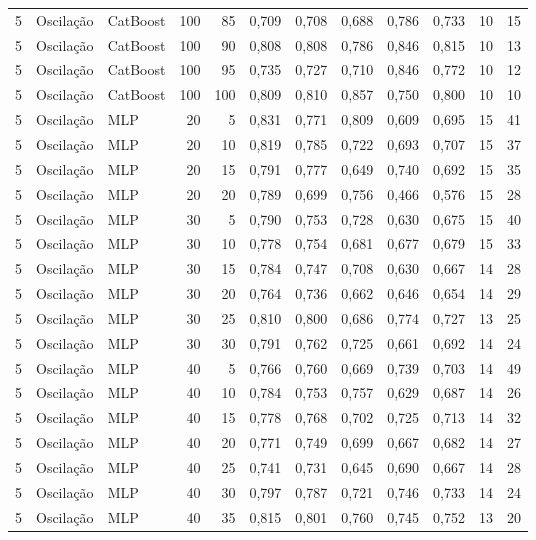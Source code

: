 \begin{longtable}{@{}rllrrrrrrrrr@{}}
5 & Oscilação & CatBoost & 100 & 85 & 0,709 & 0,708 & 0,688 & 0,786 & 0,733 & 10 & 15 \\
5 & Oscilação & CatBoost & 100 & 90 & 0,808 & 0,808 & 0,786 & 0,846 & 0,815 & 10 & 13 \\
5 & Oscilação & CatBoost & 100 & 95 & 0,735 & 0,727 & 0,710 & 0,846 & 0,772 & 10 & 12 \\
5 & Oscilação & CatBoost & 100 & 100 & 0,809 & 0,810 & 0,857 & 0,750 & 0,800 & 10 & 10 \\
5 & Oscilação & MLP & 20 & 5 & 0,831 & 0,771 & 0,809 & 0,609 & 0,695 & 15 & 41 \\
5 & Oscilação & MLP & 20 & 10 & 0,819 & 0,785 & 0,722 & 0,693 & 0,707 & 15 & 37 \\
5 & Oscilação & MLP & 20 & 15 & 0,791 & 0,777 & 0,649 & 0,740 & 0,692 & 15 & 35 \\
5 & Oscilação & MLP & 20 & 20 & 0,789 & 0,699 & 0,756 & 0,466 & 0,576 & 15 & 28 \\
5 & Oscilação & MLP & 30 & 5 & 0,790 & 0,753 & 0,728 & 0,630 & 0,675 & 15 & 40 \\
5 & Oscilação & MLP & 30 & 10 & 0,778 & 0,754 & 0,681 & 0,677 & 0,679 & 15 & 33 \\
5 & Oscilação & MLP & 30 & 15 & 0,784 & 0,747 & 0,708 & 0,630 & 0,667 & 14 & 28 \\
5 & Oscilação & MLP & 30 & 20 & 0,764 & 0,736 & 0,662 & 0,646 & 0,654 & 14 & 29 \\
5 & Oscilação & MLP & 30 & 25 & 0,810 & 0,800 & 0,686 & 0,774 & 0,727 & 13 & 25 \\
5 & Oscilação & MLP & 30 & 30 & 0,791 & 0,762 & 0,725 & 0,661 & 0,692 & 14 & 24 \\
5 & Oscilação & MLP & 40 & 5 & 0,766 & 0,760 & 0,669 & 0,739 & 0,703 & 14 & 49 \\
5 & Oscilação & MLP & 40 & 10 & 0,784 & 0,753 & 0,757 & 0,629 & 0,687 & 14 & 26 \\
5 & Oscilação & MLP & 40 & 15 & 0,778 & 0,768 & 0,702 & 0,725 & 0,713 & 14 & 32 \\
5 & Oscilação & MLP & 40 & 20 & 0,771 & 0,749 & 0,699 & 0,667 & 0,682 & 14 & 27 \\
5 & Oscilação & MLP & 40 & 25 & 0,741 & 0,731 & 0,645 & 0,690 & 0,667 & 14 & 28 \\
5 & Oscilação & MLP & 40 & 30 & 0,797 & 0,787 & 0,721 & 0,746 & 0,733 & 14 & 24 \\
5 & Oscilação & MLP & 40 & 35 & 0,815 & 0,801 & 0,760 & 0,745 & 0,752 & 13 & 20 \\

\end{longtable}
